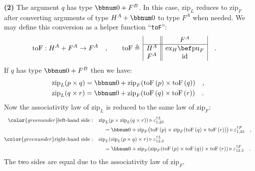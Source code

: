 \textbf{(2)} The argument $q$ has type $\bbnum 0+F^{B}$. In this
case, $\text{zip}_{L}$ reduces to $\text{zip}_{F}$ after converting
arguments of type $H^{A}+\bbnum 0$ to type $F^{A}$ when needed.
We may define this conversion as a helper function \textsf{``}\lstinline!toF!\textsf{''}:
\begin{align*}
 & \text{toF}:H^{A}+F^{A}\rightarrow F^{A}\quad,\quad\quad\text{toF}\triangleq\,\begin{array}{|c||c|}
 & F^{A}\\
\hline H^{A} & \text{ex}_{H}\bef\text{pu}_{F}\\
F^{A} & \text{id}
\end{array}\quad.
\end{align*}
If $q$ has type $\bbnum 0+F^{B}$ then we have:
\begin{align*}
 & \text{zip}_{L}(p\times q)=\bbnum 0+\text{zip}_{F}(\text{toF}\left(p\right)\times\text{toF}\left(q\right))\quad,\\
 & \text{zip}_{L}(q\times r)=\bbnum 0+\text{zip}_{F}(\text{toF}\left(q\right)\times\text{toF}\left(r\right))\quad.
\end{align*}
Now the associativity law of $\text{zip}_{L}$ is reduced to the same
law of $\text{zip}_{F}$:
\begin{align*}
{\color{greenunder}\text{left-hand side}:}\quad & \text{zip}_{L}(p\times\text{zip}_{L}(q\times r))\triangleright\varepsilon_{1,23}^{\uparrow L}\\
 & \quad=\bbnum 0+\text{zip}_{F}\big(\text{toF}\left(p\right)\times\text{zip}_{F}(\text{toF}\left(q\right)\times\text{toF}\left(r\right))\big)\triangleright\varepsilon_{1,23}^{\uparrow F}\quad,\\
{\color{greenunder}\text{right-hand side}:}\quad & \text{zip}_{L}(\text{zip}_{L}(p\times q)\times r)\triangleright\varepsilon_{12,3}^{\uparrow L}\\
 & \quad=\bbnum 0+\text{zip}_{F}(\text{zip}_{F}(\text{toF}\left(p\right)\times\text{toF}\left(q\right))\times\text{toF}\left(r\right))\triangleright\varepsilon_{12,3}^{\uparrow F}\quad.
\end{align*}
The two sides are equal due to the associativity law of $\text{zip}_{F}$.

